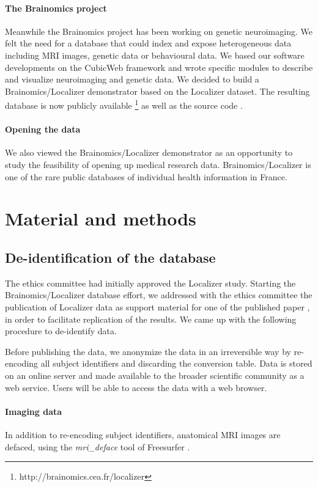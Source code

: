 \documentclass[review]{elsarticle}
\begin{document}
\paragraph{The Brainomics project} Meanwhile the Brainomics project has been working on genetic neuroimaging. We felt the need for a database that could index and expose heterogeneous data including MRI images, genetic data or behavioural data. We based our software developments on the CubicWeb framework and wrote specific modules to describe and visualize neuroimaging and genetic data. We decided to build a Brainomics/Localizer demonstrator based on the Localizer dataset. The resulting database is now publicly available \footnote{http://brainomics.cea.fr/localizer} as well as the source code \cite{Localizer}.

\paragraph{Opening the data} We also viewed the Brainomics/Localizer demonstrator as an opportunity to study the feasibility of opening up medical research data. Brainomics/Localizer is one of the rare public databases of individual health information in France.


\section{Material and methods}

\subsection{De-identification of the database}

The ethics committee had initially approved the Localizer study. Starting the Brainomics/Localizer database effort, we addressed with the ethics committee the publication of Localizer data as support material for one of the published paper \cite{Pinel2012}, in order to facilitate replication of the results. We came up with the following procedure to de-identify data.

Before publishing the data, we anonymize the data in an irreversible way by re-encoding all subject identifiers and discarding the conversion table. Data is stored on an online server and made available to the broader scientific community as a web service. Users will be able to access the data with a web browser.

\paragraph{Imaging data} In addition to re-encoding subject identifiers, anatomical MRI images are defaced, using the \textit{mri\_deface} tool of Freesurfer \cite{Fischl2012}.
\end{document}
